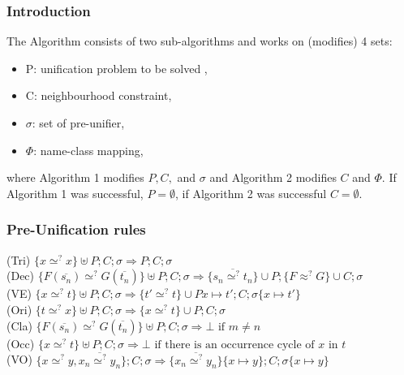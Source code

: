 

	\begin{frame}[fragile=singleslide]
	\frametitle{Introduction}
		The Algorithm consists of two sub-algorithms and works on (modifies) 4 sets:
		\begin{itemize}
			\item P: unification problem to be solved ,
			\item C: neighbourhood constraint,
			\item $\sigma$: set of pre-unifier,
			\item $\Phi$: name-class mapping,
		\end{itemize}
		where Algorithm 1 modifies \(P,C,\) and \(\sigma\) and Algorithm 2 modifies \(C\) and \(\Phi\). If Algorithm 1 was successful, \(P=\emptyset\), if Algorithm 2 was successful \(C=\emptyset\). 
  \end{frame}	
		
		
	\begin{frame}[fragile=singleslide]
	\frametitle{Pre-Unification rules}
	\textcolor[rgb]{0.55,0,0}{(Tri)} \(\{x \simeq^? x\} \uplus P;C;\sigma \Rightarrow  P; C;\sigma\) \\
		\vspace{0.3cm}
		\textcolor[rgb]{0.55,0,0}{(Dec)} \(\{F(\overline{s_n}) \simeq^? G(\overline{t_n})\} \uplus  P;C;\sigma \Rightarrow \{\overline{s_n \simeq^?t_n}\}\cup P;\{F\approx^? G\}\cup  C;\sigma\) \\
		\vspace{0.3cm}
		\textcolor[rgb]{0.55,0,0}{(VE)} \(\{x \simeq^? t\} \uplus P;C;\sigma \Rightarrow  \{t'\simeq^? t\}\cup P{x\mapsto t'}; C;\sigma\{x\mapsto t'\}\) \\
		\vspace{0.3cm}
		\textcolor[rgb]{0.55,0,0}{(Ori)} \(\{t \simeq^? x\} \uplus P;C;\sigma \Rightarrow  \{x \simeq^? t\}\cup P; C;\sigma\) \\
		\vspace{0.3cm}
		\textcolor[rgb]{0.55,0,0}{(Cla)} \(\{F(\overline{s_n}) \simeq^? G(\overline{t_n})\} \uplus P;C;\sigma \Rightarrow  \bot\text{ if } m\neq n\) \\
		\vspace{0.3cm}
		\textcolor[rgb]{0.55,0,0}{(Occ)} \(\{x \simeq^? t\} \uplus P;C;\sigma \Rightarrow  \bot\text{ if there is an occurrence cycle of }x\text{ in }t\) \\
		\vspace{0.3cm}
		\textcolor[rgb]{0.55,0,0}{(VO)} \(\{x \simeq^? y, \overline{x_n\simeq^? y_n}\};C;\sigma \Rightarrow  \{\overline{x_n\simeq^? y_n}\}\{x\mapsto y\}; C;\sigma\{x\mapsto y\}\) \\
		\vspace{0.3cm}
	
  \end{frame}	
		
